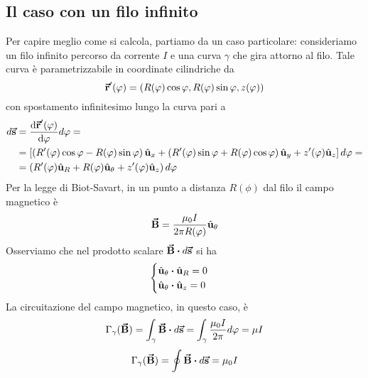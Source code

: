 \subsection{Il caso con un filo infinito}
Per capire meglio come si calcola, partiamo da un caso particolare: consideriamo un filo infinito percorso da corrente $I$ e una curva $\gamma$ che gira attorno al filo.
Tale curva è parametrizzabile in coordinate cilindriche da
\begin{equation*}
	\vb*{\va{r}}'(\varphi)=\left(R(\varphi)\cos\varphi,R(\varphi)\sin\varphi,z(\varphi)\right)
\end{equation*}
con spostamento infinitesimo lungo la curva pari a
\begin{align*}
	d\vb*{\va{s}}&=\dv{\vb*{\va{r}}'(\varphi)}{\varphi}d\varphi=\\
	&=\left[\left(R'(\varphi)\cos\varphi-R(\varphi)\sin\varphi\right)\hat{\mathbf{u}}_x+\left(R'(\varphi)\sin\varphi+R(\varphi)\cos\varphi\right)\hat{\mathbf{u}}_y+z'(\varphi)\hat{\mathbf{u}}_z\right]d\varphi=\\
	&=\left(R'(\varphi)\hat{\mathbf{u}}_R+R(\varphi)\hat{\mathbf{u}}_{\theta}+z'(\varphi)\hat{\mathbf{u}}_z\right)d\varphi
\end{align*}
Per la legge di Biot-Savart, in un punto a distanza $R(\phi)$ dal filo il campo magnetico è
\begin{equation*}
	\vb*{\va{B}}=\frac{\mu_0 I}{2\pi R(\varphi)}\hat{\mathbf{u}}_{\theta}
\end{equation*}
Osserviamo che nel prodotto scalare $\vba{B}\vdot d\vba{s}$ si ha
\begin{equation*}
	\begin{cases}
		\vbh{u}_\theta\vdot\vbh{u}_R=0\\
		\vbh{u}_\theta\vdot\vbh{u}_z=0
	\end{cases}
\end{equation*}
La circuitazione del campo magnetico, in questo caso, è
\begin{equation*}
	\Gamma_{\gamma}(\vba{B})=\int_{\gamma}\vba{B}\vdot d\vba{s}=\int_{\gamma}\frac{\mu_0 I}{2\pi}d\phi=\mu I
\end{equation*}
\begin{equation}
	\Gamma_{\gamma}(\vba{B})=\oint \vba{B}\vdot d\vba{s}=\mu_0 I
\end{equation}
